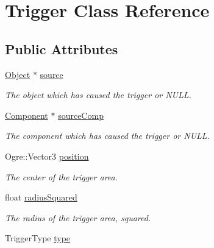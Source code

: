 \hypertarget{classTrigger}{
\section{\-Trigger \-Class \-Reference}
\label{d7/d1d/classTrigger}
}
\subsection*{\-Public \-Attributes}
\begin{DoxyCompactItemize}
\item 
\hypertarget{classTrigger_a715993a297f8f1be691bf73731c45c29}{
\hyperlink{classObject}{\-Object} $\ast$ \hyperlink{classTrigger_a715993a297f8f1be691bf73731c45c29}{source}}
\label{d7/d1d/classTrigger_a715993a297f8f1be691bf73731c45c29}

\begin{DoxyCompactList}\small\item\em \-The object which has caused the trigger or \-N\-U\-L\-L. \end{DoxyCompactList}\item 
\hypertarget{classTrigger_ad9a259ef2b7a645267cb59622046bddb}{
\hyperlink{classComponent}{\-Component} $\ast$ \hyperlink{classTrigger_ad9a259ef2b7a645267cb59622046bddb}{source\-Comp}}
\label{d7/d1d/classTrigger_ad9a259ef2b7a645267cb59622046bddb}

\begin{DoxyCompactList}\small\item\em \-The component which has caused the trigger or \-N\-U\-L\-L. \end{DoxyCompactList}\item 
\hypertarget{classTrigger_a655a8490fd7a60d88446849725f4a68a}{
\-Ogre\-::\-Vector3 \hyperlink{classTrigger_a655a8490fd7a60d88446849725f4a68a}{position}}
\label{d7/d1d/classTrigger_a655a8490fd7a60d88446849725f4a68a}

\begin{DoxyCompactList}\small\item\em \-The center of the trigger area. \end{DoxyCompactList}\item 
\hypertarget{classTrigger_ad051caf5e9d3853cd961e6a4a2b47ac0}{
float \hyperlink{classTrigger_ad051caf5e9d3853cd961e6a4a2b47ac0}{radius\-Squared}}
\label{d7/d1d/classTrigger_ad051caf5e9d3853cd961e6a4a2b47ac0}

\begin{DoxyCompactList}\small\item\em \-The radius of the trigger area, squared. \end{DoxyCompactList}\item 
\hypertarget{classTrigger_a9e29763722e34327c7b237ede84e1355}{
\-Trigger\-Type \hyperlink{classTrigger_a9e29763722e34327c7b237ede84e1355}{type}}
\label{d7/d1d/classTrigger_a9e29763722e34327c7b237ede84e1355}


\end{DoxyCompactItemize}
